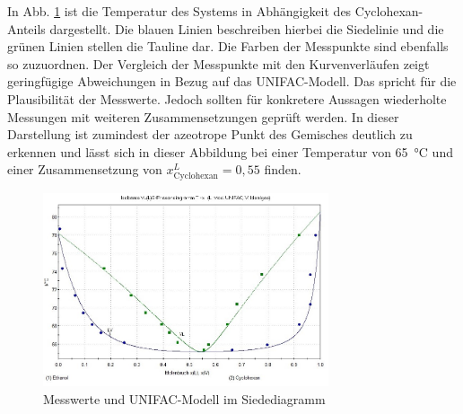 In Abb. \ref{fig:siededia_unifac} ist die Temperatur des Systems in Abhängigkeit des Cyclohexan-Anteils dargestellt. Die blauen Linien beschreiben hierbei die Siedelinie und die grünen Linien stellen die Tauline dar. Die Farben der Messpunkte sind ebenfalls so zuzuordnen. Der Vergleich der Messpunkte mit den Kurvenverläufen zeigt geringfügige Abweichungen in Bezug auf das \textsc{UNIFAC}-Modell. Das spricht für die Plausibilität der Messwerte. Jedoch sollten für konkretere Aussagen wiederholte Messungen mit weiteren Zusammensetzungen geprüft werden. In dieser Darstellung ist zumindest der azeotrope Punkt des Gemisches deutlich zu erkennen und lässt sich in dieser Abbildung bei einer Temperatur von \SI{65}{\celsius} und einer Zusammensetzung von $x^L_\text{Cyclohexan}=0,55$ finden. 

\begin{figure}[h!]
	\centering
	\includegraphics[width=0.75\textwidth]{img/Siededia_unifac}
	\caption{Messwerte und \textsc{UNIFAC}-Modell im Siedediagramm}
	\label{fig:siededia_unifac}
\end{figure}
\FloatBarrier

